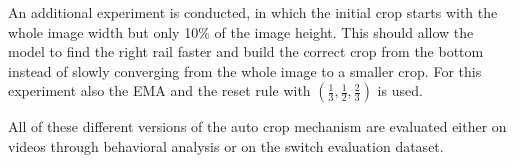 An additional experiment is conducted, in which the initial crop starts with the whole image width but only 10\% of the image height.
This should allow the model to find the right rail faster and build the correct crop from the bottom instead of slowly converging from the whole image to a smaller crop.
For this experiment also the \ac{EMA} and the reset rule with $(\frac{1}{3}, \frac{1}{2}, \frac{2}{3})$ is used.

All of these different versions of the auto crop mechanism are evaluated either on videos through behavioral analysis or on the switch evaluation dataset.


